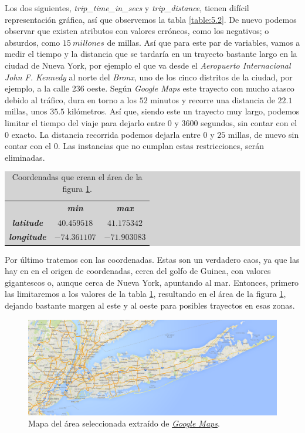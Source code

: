 Los dos siguientes, \emph{trip\_time\_in\_secs} y \emph{trip\_distance}, tienen difícil representación gráfica, así que observemos la tabla \ref{table:5.2}. De nuevo podemos observar que existen atributos con valores erróneos, como los negativos; o absurdos, como $15\:millones$ de millas. Así que para este par de variables, vamos a medir el tiempo y la distancia que se tardaría en un trayecto bastante largo en la ciudad de Nueva York, por ejemplo el que va desde el \emph{Aeropuerto Internacional John F. Kennedy} al norte del \emph{Bronx}, uno de los cinco distritos de la ciudad, por ejemplo, a la calle 236 oeste. Según \emph{Google Maps} este trayecto con mucho atasco debido al tráfico, dura en torno a los $52$ minutos y recorre una distancia de $22.1$ millas, unos $35.5$ kilómetros. Así que, siendo este un trayecto muy largo, podemos limitar el tiempo del viaje para dejarlo entre $0$ y $3600$ segundos, sin contar con el $0$ exacto. La distancia recorrida podemos dejarla entre $0$ y $25$ millas, de nuevo sin contar con el $0$. Las instancias que no cumplan estas restricciones, serán eliminadas.

\begin{table}[H]
\centering
\colorbox{lightgray}{\begin{tabular}{*{3}{c}}
  & \emph{\textbf{min}} & \emph{\textbf{max}} \\
  \emph{\textbf{latitude}} & $40.459518$ & $41.175342$ \\
  \emph{\textbf{longitude}} & $-74.361107$ & $-71.903083$
\end{tabular}}
\caption{Coordenadas que crean el área de la figura \ref{fig:5.9}.}
\label{table:5.3}
\end{table}

Por último tratemos con las coordenadas. Estas son un verdadero caos, ya que las hay en en el origen de coordenadas, cerca del golfo de Guinea, con valores gigantescos o, aunque cerca de Nueva York, apuntando al mar. Entonces, primero las limitaremos a los valores de la tabla \ref{table:5.3}, resultando en el área de la figura \ref{fig:5.9}, dejando bastante margen al este y al oeste para posibles trayectos en esas zonas.

\begin{figure}[H]
  \centering
  \includegraphics[width=140mm]{figures/ch_05/map_1.png}
  \caption{Mapa del área seleccionada extraído de \href{https://maps.google.com}{\emph{Google Maps}}.}
  \label{fig:5.9}
\end{figure}

